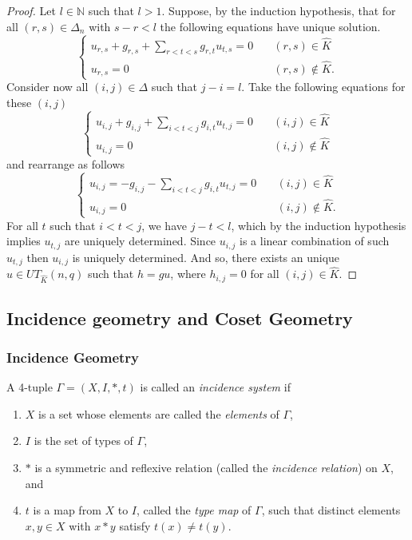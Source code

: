 \documentclass[11pt,letterpaper]{amsart}
\begin{document}
\begin{proof}
    Let $l\in \mathbb{N}$ such that $l>1$. Suppose, by the induction hypothesis, that for all $(r,s)\in\Delta_n$ with $s-r< l$ the following equations have unique solution.
    $$
    \begin{cases}
        u_{r,s}+g_{r,s} +\sum_{r<t<s} g_{r,t}u_{t,s}=0\quad &(r,s)\in \widehat{K}\\
        u_{r,s}=0 \quad &(r,s)\notin \widehat{K}.
    \end{cases}
    $$
    Consider now all $(i,j)\in \Delta$ such that $j-i=l$. Take the following equations for these $(i,j)$
    $$
    \begin{cases}
        u_{i,j}+g_{i,j} +\sum_{i<t<j} g_{i,t}u_{t,j}=0\quad &(i,j)\in \widehat{K}\\
        u_{i,j}=0 \quad &(i,j)\notin \widehat{K}
    \end{cases}
    $$
    and rearrange as follows
    $$
    \begin{cases}
        u_{i,j}=-g_{i,j} -\sum_{i<t<j} g_{i,t}u_{t,j}=0\quad &(i,j)\in \widehat{K}\\
        u_{i,j}=0 \quad &(i,j)\notin \widehat{K}.
    \end{cases}
    $$
    For all $t$ such that $i<t<j$, we have $j-t<l$, which by the induction hypothesis implies $u_{t,j}$ are uniquely determined. Since $u_{i,j}$ is a linear combination of such $u_{t,j}$ then $u_{i,j}$ is uniquely determined. And so, there exists an unique $u\in UT_{\widehat{K}}(n,q)$ such that $h=gu$, where $h_{i,j}=0$ for all $(i,j)\in \widehat{K}$. 
\end{proof}



\subsection{Incidence geometry and Coset Geometry}\label{sec:back:subsec:incidence}
\subsubsection{Incidence Geometry}
    A 4-tuple $\Gamma = (X,I,*,t)$ is called an \textit{incidence system} if
    \begin{enumerate}
        \item $X$ is a set whose elements are called the \textit{elements} of $\Gamma$,
        \item $I$ is the set of types of $\Gamma$, 
        \item $*$ is a symmetric and reflexive relation (called the \textit{incidence relation}) on $X$, and
        \item $t$ is a map from $X$ to $I$, called the \textit{type map} of $\Gamma$, such that distinct elements $x,y \in X$ with $x * y$ satisfy $t(x) \neq t(y)$. 
    \end{enumerate}
\end{document}
